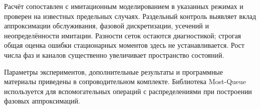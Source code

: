 \documentclass[a4paper,12pt]{article}
\begin{document}
Расчёт сопоставлен с имитационным моделированием в указанных режимах и проверен на известных предельных случаях. Раздельный контроль выявляет вклад аппроксимации обслуживания, фазовой дискретизации, усечений и неопределённости имитации. Разности сеток остаются диагностикой; строгая общая оценка ошибки стационарных моментов здесь не устанавливается. Рост числа фаз и каналов существенно увеличивает пространство состояний.

Параметры экспериментов, дополнительные результаты и программные материалы приведены в сопроводительном комплекте. Библиотека Most-Queue \cite{mostqueue2026} используется для вспомогательных операций с распределениями при построении фазовых аппроксимаций.

\printbibliography
\end{document}
